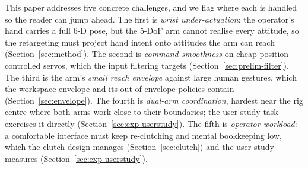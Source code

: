 This paper addresses five concrete challenges, and we flag where each is
handled so the reader can jump ahead. The first is \emph{wrist
under-actuation}: the operator's hand carries a full 6-D pose, but the
5-DoF arm cannot realise every attitude, so the retargeting must project
hand intent onto attitudes the arm can reach (Section~\ref{sec:method}).
The second is \emph{command smoothness} on cheap position-controlled
servos, which the input filtering targets
(Section~\ref{sec:prelim-filter}). The third is the arm's \emph{small
reach envelope} against large human gestures, which the workspace
envelope and its out-of-envelope policies contain
(Section~\ref{sec:envelope}). The fourth is \emph{dual-arm
coordination}, hardest near the rig centre where both arms work close to
their boundaries; the user-study task exercises it directly
(Section~\ref{sec:exp-userstudy}). The fifth is \emph{operator
workload}: a comfortable interface must keep re-clutching and mental
bookkeeping low, which the clutch design manages
(Section~\ref{sec:clutch}) and the user study measures
(Section~\ref{sec:exp-userstudy}).


